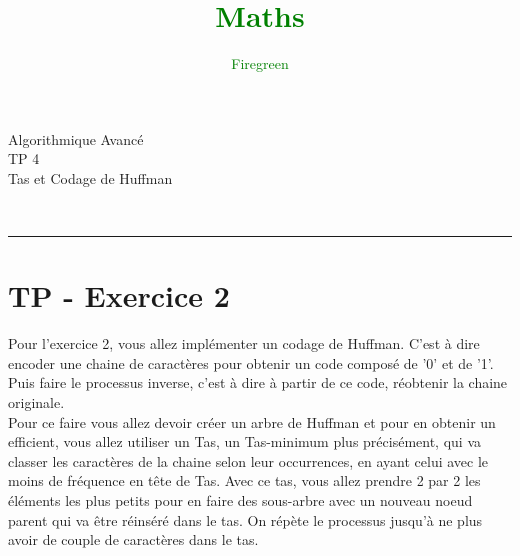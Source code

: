 \documentclass[11pt]{extarticle}
\author{\textcolor{Green}{Firegreen}}
\title{\textcolor{Green}{\textbf{Maths}}}
\begin{document}
\begin{minipage}[t]{0.3\paperwidth}
\begin{flushleft}
\end{flushleft}
\end{minipage}
\begin{minipage}[t]{0.4\paperwidth}
\begin{flushright}
\noindent \Huge{Algorithmique Avancé} \\
\noindent \LARGE{TP 4} \\
\noindent \Large{Tas et Codage de Huffman}
\end{flushright}
\end{minipage}\\
\begin{center}
\rule{\textwidth}{0.2cm}
\end{center}
\section{TP - Exercice 2}

Pour l'exercice 2, vous allez implémenter un codage de Huffman. C'est à dire encoder une chaine de caractères pour obtenir un code composé de '0' et de '1'. Puis faire le processus inverse, c'est à dire à partir de ce code, réobtenir la chaine originale.\\
Pour ce faire vous allez devoir créer un arbre de Huffman et pour en obtenir un efficient, vous allez utiliser un Tas, un Tas-minimum plus précisément, qui va classer les caractères de la chaine selon leur occurrences, en ayant celui avec le moins de fréquence en tête de Tas. Avec ce tas, vous allez prendre 2 par 2 les éléments les plus petits pour en faire des sous-arbre avec un nouveau noeud parent qui va être réinséré dans le tas. On répète le processus jusqu'à ne plus avoir de couple de caractères dans le tas.
\end{document}
